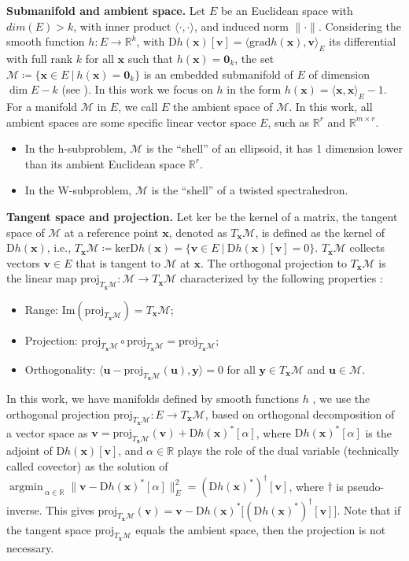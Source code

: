 \documentclass[sn-mathphys-num]{sn-jnl}
\DeclareMathOperator*{\argmin}{\textrm{argmin}\,} %
\def\grad            {\textrm{grad}}     %
\def\proj            {\textrm{proj}}     %
\def\zeros           {\bm{0}}            %
\def\IR  {\mathbb{R}} 	    %
\def\IRr {\IR^{r}} 			%
\def\IRmr{\IR^{m \times r}} %
\def\u {\bm{u}}
\def\v {\bm{v}}
\def\x {\bm{x}}
\def\y {\bm{y}}
\def\cM { \mathcal{M}}
\begin{document}
\noindent\textbf{Submanifold and ambient space.}
Let $E$ be an Euclidean space with $dim(E)>k$, with inner product $\langle\cdot,\cdot\rangle$, and induced norm $\|\cdot\|$. 
Considering the smooth function $h : E \to \IR^k$, with $\textrm{D}h(\x)[\v] = \langle \grad h(\x), \v\rangle_E$ its differential with full
rank $k$ for all $\x$ such that $h(\x) = \zeros_k$, the set $\cM \coloneqq \{ \x \in E ~|~ h(\x) = \zeros_k \}$ is an embedded submanifold of $E$ of dimension $\dim E -k$ (see \cite[Ch7.7]{boumal2023introduction}).
In this work we focus on $h$ in the form $h(\x)=\langle\x,\x\rangle_E-1$.
For a manifold $\cM$ in $E$, we call $E$ the ambient space of $\cM$.
In this work, all ambient spaces are some specific linear vector space $E$, such as $\IRr$ and $\IRmr$.
\begin{itemize}
\item In the h-subproblem, $\cM$ is the ``shell'' of an ellipsoid, it has 1 dimension  lower than its ambient Euclidean space $\IRr$. 

\item In the W-subproblem, $\cM$ is the ``shell'' of a twisted spectrahedron.
\end{itemize}


\noindent\textbf{Tangent space and projection.}
Let $\textrm{ker}$ be the kernel of a matrix, the tangent space of $\cM$ at a reference point $\x$, denoted as $T_{\x}\cM$, is defined as the kernel of $\textrm{D}h(\x)$, i.e., 
$
T_{\x}\cM 
\coloneqq
\text{ker}\textrm{D}h(\x) 
=
\{ \v \in E ~|~ \textrm{D}h(\x)[\v]  = 0\}
$.
$T_{\x}\cM$ collects vectors $\v \in E$ that is tangent to $\cM$ at $\x$.
The orthogonal projection to $T_{\x}\cM$ is the linear map $\proj_{T_{\x}\cM}: \cM \to T_{\x}\cM$ characterized by the following properties \cite[Ch3, Def3.60]{boumal2023introduction}:
\begin{itemize}
    \item Range: $\textrm{Im}(\proj_{T_{\x}\cM})=T_{\x}\cM$;
    \item Projection: $\proj_{T_{\x}\cM}\circ \proj_{T_{\x}\cM}= \proj_{T_{\x}\cM}$;
\item Orthogonality: $\langle\u-\proj_{T_{\x}\cM}(\u),\y\rangle=0$ for all $\y\in T_{\x}\cM$ and $\u\in\cM$.
\end{itemize}
In this work, we have manifolds defined by smooth functions $h$ \cite[]{boumal2023introduction}, we  use the
orthogonal projection $\proj_{T_{\x}\cM}: E \to T_{\x}\cM$, based on orthogonal decomposition of a vector space as
$\v = \proj_{T_{\x}\cM}(\v) +   \textrm{D}h(\x)^*[\alpha]$,
where $\textrm{D}h(\x)^*[\alpha]$ is the adjoint of $\textrm{D}h(\x)[\v]$, and $\alpha \in \IR$ plays the role of the dual variable (technically called covector) as the
solution of 
$ \argmin_{\alpha \in \IR} \| \v - \textrm{D}h(\x)^*[\alpha] \|_E^2 = (\textrm{D}h(\x)^*)^\dagger[\v]$, 
where $\dagger$ is pseudo-inverse.
This gives $\proj_{T_{\x}\cM}(\v) = \v - \textrm{D}h(\x)^* \big[
(\textrm{D}h(\x)^*)^\dagger[\v] \big]$.
Note that if the tangent space $\proj_{T_{\x}\cM}$ equals the ambient space, then the projection is not necessary.
\end{document}
